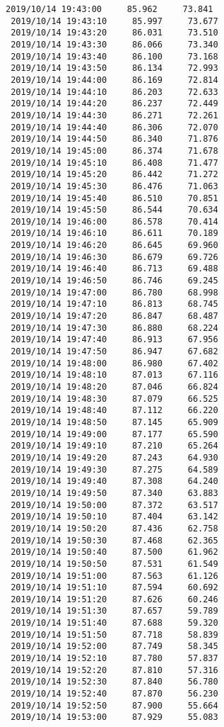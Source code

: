 \documentclass[11pt]{article}
\begin{document}
\begin{Verbatim}[commandchars=\\\{\}]
 2019/10/14 19:43:00     85.962     73.841
 2019/10/14 19:43:10     85.997     73.677
 2019/10/14 19:43:20     86.031     73.510
 2019/10/14 19:43:30     86.066     73.340
 2019/10/14 19:43:40     86.100     73.168
 2019/10/14 19:43:50     86.134     72.993
 2019/10/14 19:44:00     86.169     72.814
 2019/10/14 19:44:10     86.203     72.633
 2019/10/14 19:44:20     86.237     72.449
 2019/10/14 19:44:30     86.271     72.261
 2019/10/14 19:44:40     86.306     72.070
 2019/10/14 19:44:50     86.340     71.876
 2019/10/14 19:45:00     86.374     71.678
 2019/10/14 19:45:10     86.408     71.477
 2019/10/14 19:45:20     86.442     71.272
 2019/10/14 19:45:30     86.476     71.063
 2019/10/14 19:45:40     86.510     70.851
 2019/10/14 19:45:50     86.544     70.634
 2019/10/14 19:46:00     86.578     70.414
 2019/10/14 19:46:10     86.611     70.189
 2019/10/14 19:46:20     86.645     69.960
 2019/10/14 19:46:30     86.679     69.726
 2019/10/14 19:46:40     86.713     69.488
 2019/10/14 19:46:50     86.746     69.245
 2019/10/14 19:47:00     86.780     68.998
 2019/10/14 19:47:10     86.813     68.745
 2019/10/14 19:47:20     86.847     68.487
 2019/10/14 19:47:30     86.880     68.224
 2019/10/14 19:47:40     86.913     67.956
 2019/10/14 19:47:50     86.947     67.682
 2019/10/14 19:48:00     86.980     67.402
 2019/10/14 19:48:10     87.013     67.116
 2019/10/14 19:48:20     87.046     66.824
 2019/10/14 19:48:30     87.079     66.525
 2019/10/14 19:48:40     87.112     66.220
 2019/10/14 19:48:50     87.145     65.909
 2019/10/14 19:49:00     87.177     65.590
 2019/10/14 19:49:10     87.210     65.264
 2019/10/14 19:49:20     87.243     64.930
 2019/10/14 19:49:30     87.275     64.589
 2019/10/14 19:49:40     87.308     64.240
 2019/10/14 19:49:50     87.340     63.883
 2019/10/14 19:50:00     87.372     63.517
 2019/10/14 19:50:10     87.404     63.142
 2019/10/14 19:50:20     87.436     62.758
 2019/10/14 19:50:30     87.468     62.365
 2019/10/14 19:50:40     87.500     61.962
 2019/10/14 19:50:50     87.531     61.549
 2019/10/14 19:51:00     87.563     61.126
 2019/10/14 19:51:10     87.594     60.692
 2019/10/14 19:51:20     87.626     60.246
 2019/10/14 19:51:30     87.657     59.789
 2019/10/14 19:51:40     87.688     59.320
 2019/10/14 19:51:50     87.718     58.839
 2019/10/14 19:52:00     87.749     58.345
 2019/10/14 19:52:10     87.780     57.837
 2019/10/14 19:52:20     87.810     57.316
 2019/10/14 19:52:30     87.840     56.780
 2019/10/14 19:52:40     87.870     56.230
 2019/10/14 19:52:50     87.900     55.664
 2019/10/14 19:53:00     87.929     55.083

\end{Verbatim}
\end{document}
